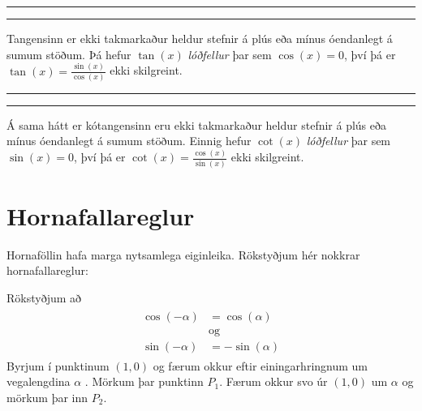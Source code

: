 \documentclass[a4paper,10pt,icelandic]{sphinxmanual}
\begin{document}
\bigskip\hrule\bigskip




\bigskip\hrule\bigskip


Tangensinn er ekki takmarkaður heldur stefnir á plús eða mínus óendanlegt á sumum stöðum.
Þá hefur \(\tan(x)\) \textit{lóðfellur} þar sem \(\cos(x)=0\), því þá er \(\tan(x) = \frac{\sin(x)}{\cos(x)}\) ekki skilgreint.


\bigskip\hrule\bigskip




\bigskip\hrule\bigskip


Á sama hátt er kótangensinn eru ekki takmarkaður heldur stefnir á plús eða mínus óendanlegt á sumum stöðum. Einnig hefur \(\cot(x)\) \textit{lóðfellur} þar sem \(\sin(x)=0\), því þá er \(\cot(x) = \frac{\cos(x)}{\sin(x)}\) ekki skilgreint.


\section{Hornafallareglur}
\label{\detokenize{Kafli07:hornafallareglur}}\label{\detokenize{Kafli07:s-hornafoll}}
Hornaföllin hafa marga nytsamlega eiginleika. Rökstyðjum hér nokkrar hornafallareglur:

 Rökstyðjum að
\begin{equation*}
\begin{split}\begin{aligned}
\cos(-\alpha)&=\cos(\alpha) \\
&\text{og} \\
\sin(-\alpha)&=-\sin(\alpha)
\end{aligned}\end{split}
\end{equation*}
Byrjum í punktinum \((1,0)\) og færum okkur  eftir einingarhringnum um vegalengdina \(\alpha\) . Mörkum þar punktinn \(P_1\).
Færum okkur svo úr \((1,0)\)  um \(\alpha\) og mörkum þar inn \(P_2\).

\end{document}
